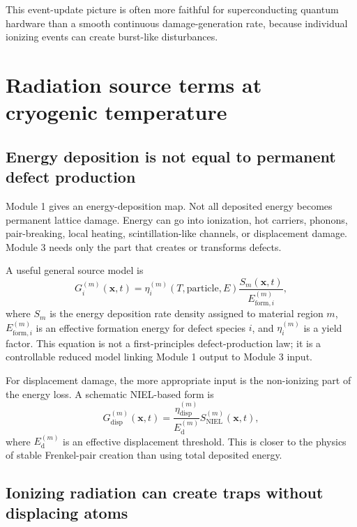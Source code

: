 \documentclass[11pt]{article}
\newcommand{\x}{\mathbf{x}}
\begin{document}
This event-update picture is often more faithful for superconducting quantum hardware than a smooth continuous damage-generation rate, because individual ionizing events can create burst-like disturbances.

\section{Radiation source terms at cryogenic temperature}

\subsection{Energy deposition is not equal to permanent defect production}

Module 1 gives an energy-deposition map. Not all deposited energy becomes permanent lattice damage. Energy can go into ionization, hot carriers, phonons, pair-breaking, local heating, scintillation-like channels, or displacement damage. Module 3 needs only the part that creates or transforms defects.

A useful general source model is
\begin{equation}
G_i^{(m)}(\x,t)
=\eta_i^{(m)}(T,\mathrm{particle},E)\frac{S_m(\x,t)}{E_{\mathrm{form},i}^{(m)}},
\label{eq:source_yield}
\end{equation}
where $S_m$ is the energy deposition rate density assigned to material region $m$, $E_{\mathrm{form},i}^{(m)}$ is an effective formation energy for defect species $i$, and $\eta_i^{(m)}$ is a yield factor. This equation is not a first-principles defect-production law; it is a controllable reduced model linking Module 1 output to Module 3 input.

For displacement damage, the more appropriate input is the non-ionizing part of the energy loss. A schematic NIEL-based form is
\begin{equation}
G_{\mathrm{disp}}^{(m)}(\x,t)
= \frac{\eta_{\mathrm{disp}}^{(m)}}{E_{\mathrm{d}}^{(m)}} S_{\mathrm{NIEL}}^{(m)}(\x,t),
\label{eq:niel_source}
\end{equation}
where $E_{\mathrm{d}}^{(m)}$ is an effective displacement threshold. This is closer to the physics of stable Frenkel-pair creation than using total deposited energy.

\subsection{Ionizing radiation can create traps without displacing atoms}
\end{document}
